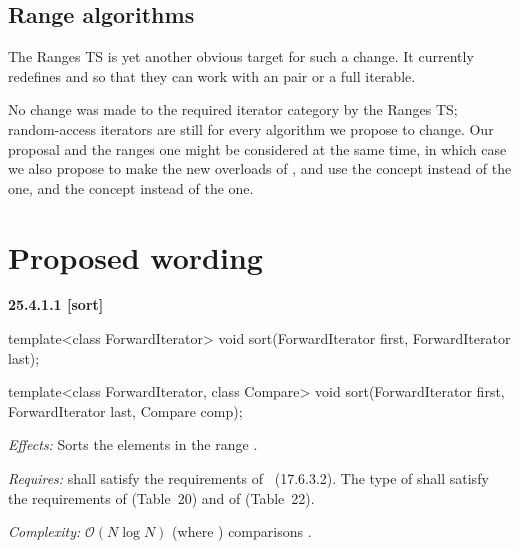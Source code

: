 \documentclass{isocpp_proposal}
\begin{document}
\subsection{Range algorithms}

The Ranges TS \cite{N4560} is yet another obvious target for such a change. It currently redefines  and  so that they can work with an \tcode{[iterator, sentinel)} pair or a full iterable.

\vspace{0.3cm}

No change was made to the required iterator category by the Ranges TS; random-access iterators are still for every algorithm we propose to change. Our proposal and the ranges one might be considered at the same time, in which case we also propose to make the new overloads of ,  and  use the  concept instead of the  one, and the  concept instead of the  one.

\section{Proposed wording}

\textbf{25.4.1.1  [sort]}

\begin{itemdecl}
template<class ForwardIterator>
  void sort(ForwardIterator first, ForwardIterator last);

template<class ForwardIterator, class Compare>
  void sort(ForwardIterator first, ForwardIterator last,
            Compare comp);
\end{itemdecl}

\begin{itemdescr}
\pnum
\emph{Effects:} Sorts the elements in the range \tcode{[first, last)}.

\pnum
\emph{Requires:}  shall satisfy the requirements of
~(17.6.3.2). The type of  shall satisfy the requirements of  (Table~20) and of  (Table~22).

\pnum
\emph{Complexity:} $\mathcal{O}(N \log{} N)$ (where ) comparisons .
\end{itemdescr}
\end{document}
